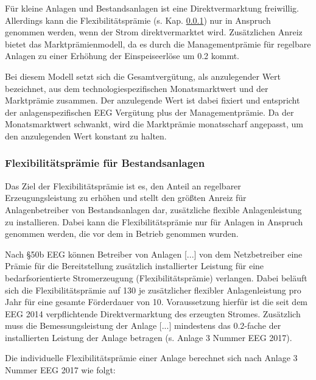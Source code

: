 Für kleine Anlagen und Bestandsanlagen ist eine Direktvermarktung freiwillig. Allerdings kann die Flexibilitätsprämie (s. Kap. \ref{chap:law_FP}) nur in Anspruch genommen werden, wenn der Strom direktvermarktet wird. Zusätzlichen Anreiz bietet das Marktprämienmodell, da es durch die Managementprämie für regelbare Anlagen zu einer Erhöhung der Einspeiseerlöse um \SI{0.2}{\ctkwh} kommt.\smallskip

Bei diesem Modell setzt sich die Gesamtvergütung, als anzulegender Wert bezeichnet, aus dem technologiespezifischen Monatsmarktwert und der Marktprämie zusammen. Der anzulegende Wert ist dabei fixiert und entspricht der anlagenspezifischen \gls{EEG} Vergütung plus der Managementprämie. Da der Monatsmarktwert schwankt, wird die Marktprämie monatsscharf angepasst, um den anzulegenden Wert konstant zu halten. \parencite{NKGH-DV}


\subsubsection{Flexibilitätsprämie für Bestandsanlagen}\label{chap:law_FP}

Das Ziel der Flexibilitätsprämie ist es, den Anteil an regelbarer Erzeugungsleistung zu erhöhen und stellt den größten Anreiz für Anlagenbetreiber von Bestandsanlagen dar, zusätzliche flexible Anlagenleistung zu installieren. Dabei kann die Flexibilitätsprämie nur für Anlagen in Anspruch genommen werden, die vor dem  in Betrieb genommen wurden.\smallskip

Nach \S 50b \gls{EEG} können \glqq Betreiber von Anlagen [...] von dem Netzbetreiber eine Prämie für die Bereitstellung zusätzlich installierter Leistung für eine bedarfsorientierte Stromerzeugung (Flexibilitätsprämie) verlangen.\grqq{} Dabei beläuft sich die Flexibilitätsprämie auf \SI{130}{\sieuro} je \si{\kw} zusätzlicher flexibler Anlagenleistung pro Jahr für eine gesamte Förderdauer von \SI{10}{\Jahren}. Voraussetzung hierfür ist die seit dem \gls{EEG} \SI{2014}{\relax} verpflichtende Direktvermarktung des erzeugten Stromes. Zusätzlich muss \glqq{}die Bemessungsleistung der Anlage [...] mindestens das \SI{0.2}{\relax}-fache der installierten Leistung der Anlage\grqq{} betragen (s. Anlage 3 Nummer  \gls{EEG} \SI{2017}{\relax}). \parencite{BJV2014} \parencite{DanielGromke2019}\smallskip

Die individuelle Flexibilitätsprämie einer Anlage berechnet sich nach Anlage 3 Nummer  \gls{EEG} \SI{2017}{\relax} wie folgt:

